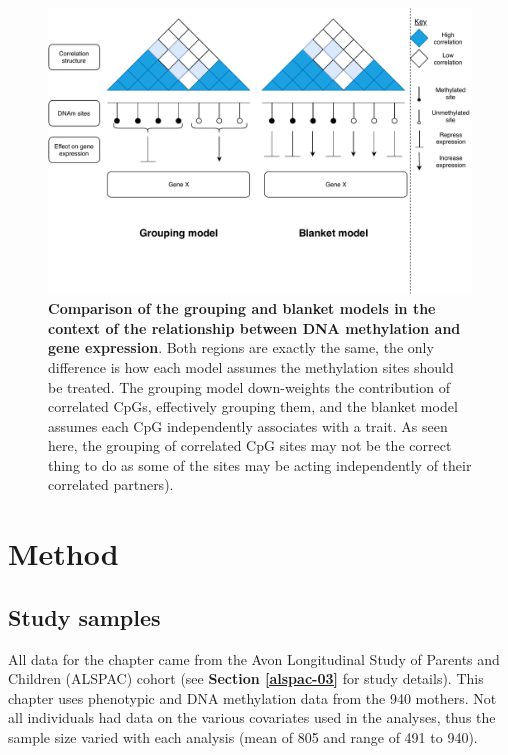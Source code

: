 \documentclass[11pt,oneside]{bristolthesis}
\begin{document}
\begin{figure}

{\centering \includegraphics[width=1\linewidth]{figure/05-h2ewas/m2_model_comparison} 

}

\caption[Comparison of the grouping and blanket models in the context of the relationship between DNA methylation and gene expression]{\textbf{Comparison of the grouping and blanket models in the context of the relationship between DNA methylation and gene expression}. Both regions are exactly the same, the only difference is how each model assumes the methylation sites should be treated. The grouping model down-weights the contribution of correlated CpGs, effectively grouping them, and the blanket model assumes each CpG independently associates with a trait. As seen here, the grouping of correlated CpG sites may not be the correct thing to do as some of the sites may be acting independently of their correlated partners).}\label{fig:h2ewas-model-comp}
\end{figure}
\hypertarget{method-05}{%
\section{Method}\label{method-05}}

\hypertarget{study-samples-05}{%
\subsection{Study samples}\label{study-samples-05}}

All data for the chapter came from the Avon Longitudinal Study of Parents and Children (ALSPAC) cohort (see \textbf{Section \ref{alspac-03}} for study details). This chapter uses phenotypic and DNA methylation data from the 940 mothers. Not all individuals had data on the various covariates used in the analyses, thus the sample size varied with each analysis (mean of 805 and range of 491 to 940).
\end{document}
